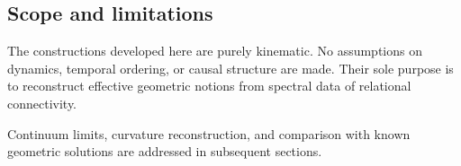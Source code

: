\subsection{Scope and limitations}
  \label{subsec:scope-and-limitations}

  The constructions developed here are purely kinematic.
  No assumptions on dynamics, temporal ordering, or causal structure are made.
  Their sole purpose is to reconstruct effective geometric notions from spectral
  data of relational connectivity.

  Continuum limits, curvature reconstruction, and comparison with known
  geometric solutions are addressed in subsequent sections.
